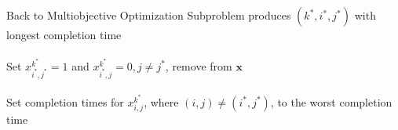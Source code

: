 \documentclass[presentation,professionalfonts]{beamer}
\begin{document}
\begin{frame}{Back to Multiobjective Optimization}
  Subproblem produces \((k^*, i^*, j^*)\) with longest completion time
  \\~\\
  Set \(x^{k^*}_{i^*, j^*} = 1\) and \(x^{k^*}_{i^*, j} = 0, j\neq j^*\), remove from \(\bm{x}\)
  \\~\\
  Set completion times for \(x^{k^*}_{i, j}\), where \((i, j)\neq
  (i^*, j^*)\), to the worst completion time
  \end{frame}
\end{document}
